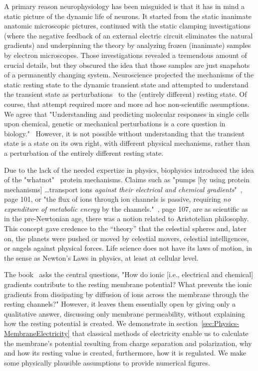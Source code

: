 \else
A primary reason neurophysiology has been misguided is that it has in mind a static picture of the dynamic life of neurons.
It started from the static
inanimate anatomic microscopic pictures, continued
with the static clamping investigations (where
the negative feedback of an external electric circuit eliminates the natural gradients) and underpinning the
theory by analyzing frozen (inanimate) samples
by electron microscopes.
Those investigations revealed a tremendous amount of crucial details,
but they obscured the idea
that those samples are just snapshots of a permanently
changing system.
Neuroscience projected the mechanisms of the static resting state to the dynamic transient state and attempted
to understand the transient state 
as perturbations~\cite{PerturbationNeuralComputation:2002} to the  (entirely different) resting state.
Of course, that attempt required more and more ad hoc non-scientific assumptions.
We agree that "Understanding and predicting molecular responses
in single cells upon chemical, genetic or mechanical perturbations is a core question in biology."~\cite{PerturbationSingleCell:2023}
However, it is not possible without understanding that the transient state is a state on its own right,
with different physical mechanisms, rather than a perturbation of the entirely different resting state.

Due to the lack of the needed expertize in physics,
biophysics introduced the idea of the "whatnot"~\cite{Schrodinger:1992} protein mechanisms.
Claims such as "pumps [by using protein mechanisms] \dots transport ions \textit{against their
electrical and chemical gradients}"~\cite{PrinciplesNeuralScience:2013}, page 101, 
or "the flux of ions through ion channels is passive,
requiring \textit{no expenditure of metabolic energy} by the
channels."~\cite{PrinciplesNeuralScience:2013}, page 107, are as scientific as in the pre-Newtonian age,
there was a notion related to Aristotelian philosophy. This concept gave credence to the “theory” that the celestial spheres and, later on, the planets were pushed or moved by celestial movers, celestial intelligences, or angels against physical forces. Life science does not have its laws of motion, in the sense as Newton's Laws in physics, at least at cellular level. 

\fi


\ifx\magyar\undefined

The book~\cite{PrinciplesNeuralScience:2013} asks the central questions, "How do ionic [i.e., electrical and chemical] gradients contribute to the resting membrane potential? What prevents
the ionic gradients from dissipating by diffusion of
ions across the membrane through the resting channels?"
However, it leaves them essentially open by giving only a qualitative answer, discussing only membrane permeability, without explaining how the resting potential is created.
%
We demonstrate in section~\ref{sec:Physics-MembraneElectricity} that classical methods of electricity enable us to calculate the membrane's potential resulting from charge separation and polarization, why and how its resting value is created, furthermore, how it is regulated.
We make some physically plausible assumptions to provide numerical figures.


